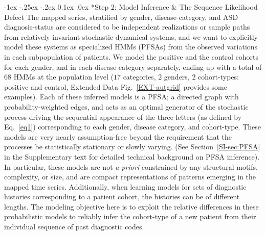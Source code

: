 \documentclass[onecolumn,,10pt]{IEEEtran}
\makeatletter
\renewcommand\subsection{\@startsection {section}{1}{\z@}%
  {-1ex \@plus -.25ex \@minus -.2ex}%
  {0.1ex \@plus.0ex}%
  {\fontsize{11}{12}\selectfont\bfseries\sffamily\color{DodgerBlue4}}}
\def\treatment{positive\xspace}
\makeatother
\begin{document}
\subsection*{Step 2: Model Inference \& The Sequence Likelihood Defect}
The mapped series, stratified by  gender, disease-category, and ASD diagnosis-status are considered to be independent realizations or sample paths from  relatively invariant stochastic dynamical systems, and we want to explicitly model these systems as specialized HMMs (PFSAs) from the observed variations in each subpopulation of patients. We model the \treatment and the control cohorts for each gender, and in  each disease category separately, ending up with a total of $68$ HMMs at the population level ($17$ categories, $2$ genders, $2$ cohort-types: \treatment and control, Extended Data Fig.~\ref{EXT-autgrid} provides some examples). Each of these inferred models is  a PFSA;  a directed graph with probability-weighted edges, and acts as an optimal generator of the  stochastic process driving the  sequential appearance of the three letters (as defined by Eq.~\eqref{eq1})  corresponding to each gender, disease category, and cohort-type. These models  are very nearly assumption-free beyond the requirement that  the processes be statistically stationary or slowly varying. (See Section~\ref{SI-sec:PFSA} in the Supplementary text for detailed technical background on PFSA inference).  In particular, these models are not  \textit{a priori}  constrained by any structural motifs, complexity, or size, and are   compact representations of  patterns emerging in the mapped time series. Additionally, when learning models for sets of diagnostic histories corresponding to a patient cohort, the histories can be of different lengths. The modeling objective here is to exploit the relative differences in these  probabilistic  models to reliably infer the cohort-type of a new patient from their  individual sequence  of past diagnostic codes.
\end{document}
